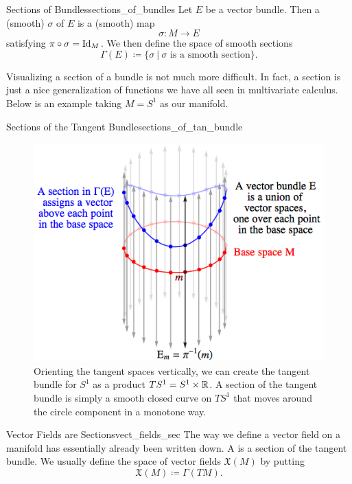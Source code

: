 \begin{df}{Sections of Bundles}{sections_of_bundles}
Let $E$ be a vector bundle.  Then a (smooth)  $\sigma$ of $E$ is a (smooth) map
\[
\sigma \colon M \to E
\]
satisfying $\pi \circ \sigma = \mathrm{Id}_M$. We then define the space of smooth sections
\[
\Gamma(E)\coloneqq \{\sigma ~\vert~ \textrm{$\sigma$ is a smooth section}\}.
\]
\end{df}

Visualizing a section of a bundle is not much more difficult.  In fact, a section is just a nice generalization of functions we have all seen in multivariate calculus.  Below is an example taking $M=S^1$ as our manifold. 


\begin{fig}{Sections of the Tangent Bundle}{sections_of_tan_bundle}
\begin{figure}[H]
    \centering
    \includegraphics[width=.6\textwidth]{s1_tan_bundle.png}
    \caption{Orienting the tangent spaces vertically, we can create the tangent bundle for $S^1$ as a product $TS^1=S^1\times \mathbb{R}$. A section of the tangent bundle is simply a smooth closed curve on $TS^1$ that moves around the circle component in a monotone way.}
    \label{fig:tangent_bundle_sec}
\end{figure}
\end{fig}

\begin{rmk}{Vector Fields are Sections}{vect_fields_sec}
The way we define a vector field on a manifold has essentially already been written down. A  is a section of the tangent bundle. We usually define the space of vector fields $\mathfrak{X}(M)$ by putting
\[
\mathfrak{X}(M)\coloneqq \Gamma(TM).
\]
\end{rmk}


